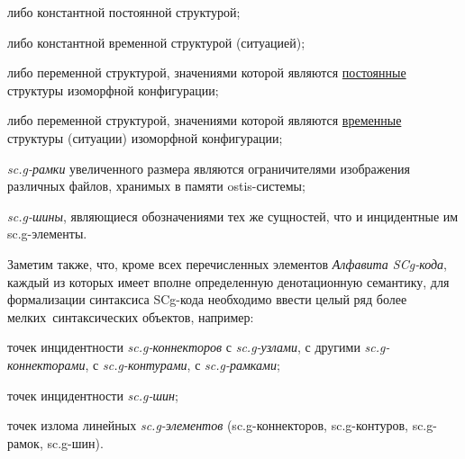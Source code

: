 \begin{SCn}
\begin{scnstruct}
\begin{scnsubstruct}
{\begin{scnitemize}
\begin{scnitemizeii}
            \item{либо константной постоянной структурой;}\item{либо константной временной структурой (ситуацией);}\item{либо переменной структурой, значениями которой являются \uline{постоянные} структуры изоморфной  конфигурации;}\item{либо переменной структурой, значениями которой являются \uline{временные} структуры (ситуации) изоморфной  конфигурации;}\end{scnitemizeii}
            \item{\textit{sc.g-рамки} увеличенного размера являются ограничителями изображения различных файлов, хранимых в памяти ostis-системы;}\item{\textit{sc.g-шины}, являющиеся обозначениями тех же сущностей, что и инцидентные им sc.g-элементы.}\end{scnitemize}
            Заметим также, что, кроме всех перечисленных элементов \textit{Алфавита SCg-кода}, каждый из которых имеет вполне определенную денотационную  семантику, для формализации синтаксиса SCg-кода необходимо ввести целый ряд более мелких\ синтаксических объектов, например:\begin{scnitemize}
            \item{точек инцидентности \textit{sc.g-коннекторов} с \textit{sc.g-узлами}, с другими \textit{sc.g-коннекторами}, с \textit{sc.g-контурами}, с \textit{sc.g-рамками};}\item{точек инцидентности \textit{sc.g-шин};}\item{точек излома линейных \textit{sc.g-элементов} (sc.g-коннекторов, sc.g-контуров, sc.g-рамок, sc.g-шин).}\end{scnitemize}
            }
            \begin{scnhaselementset}
\end{scnhaselementset}
\end{scnsubstruct}
\end{scnstruct}
\end{SCn}
